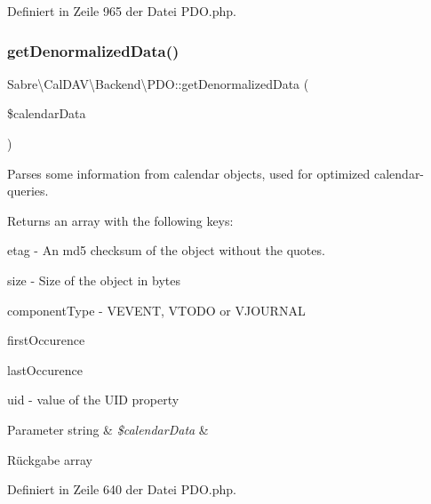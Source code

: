 Definiert in Zeile 965 der Datei P\+D\+O.\+php.

\mbox{\label{class_sabre_1_1_cal_d_a_v_1_1_backend_1_1_p_d_o_af50966457ed8b0b9fd65e2ef70f3f415}} 
\subsubsection{\texorpdfstring{get\+Denormalized\+Data()}{getDenormalizedData()}}
{\footnotesize\ttfamily Sabre\textbackslash{}\+Cal\+D\+A\+V\textbackslash{}\+Backend\textbackslash{}\+P\+D\+O\+::get\+Denormalized\+Data (\begin{DoxyParamCaption}\item[{}]{\$calendar\+Data }\end{DoxyParamCaption})\hspace{0.3cm}{\ttfamily [protected]}}

Parses some information from calendar objects, used for optimized calendar-\/queries.

Returns an array with the following keys\+:
\begin{DoxyItemize}
\item etag -\/ An md5 checksum of the object without the quotes.
\item size -\/ Size of the object in bytes
\item component\+Type -\/ V\+E\+V\+E\+NT, V\+T\+O\+DO or V\+J\+O\+U\+R\+N\+AL
\item first\+Occurence
\item last\+Occurence
\item uid -\/ value of the U\+ID property
\end{DoxyItemize}


\begin{DoxyParams}[1]{Parameter}
string & {\em \$calendar\+Data} & \\
\hline
\end{DoxyParams}
\begin{DoxyReturn}{Rückgabe}
array 
\end{DoxyReturn}


Definiert in Zeile 640 der Datei P\+D\+O.\+php.

